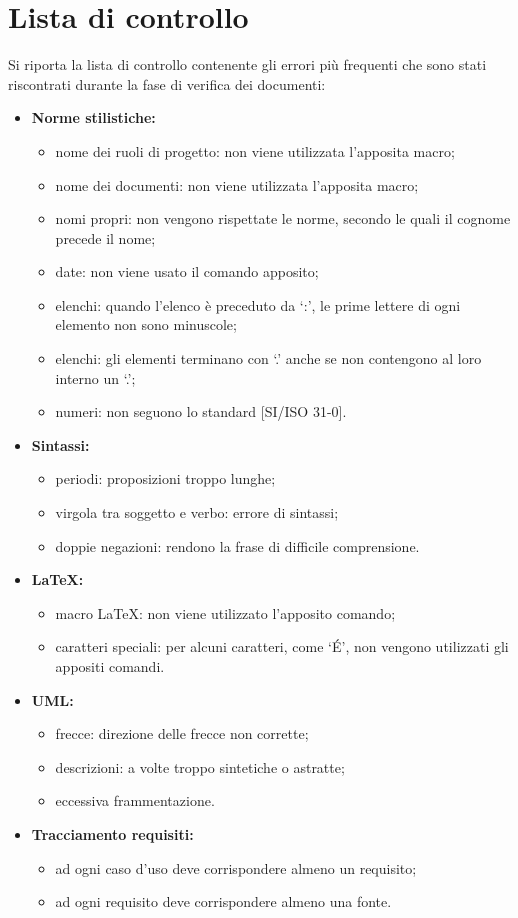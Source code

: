 \section{Lista di controllo}
Si riporta la lista di controllo contenente gli errori più frequenti che sono stati riscontrati durante la fase di verifica dei documenti:
\begin{itemize}
	\item \textbf{Norme stilistiche:}
	\begin{itemize}
		\item nome dei ruoli di progetto: non viene utilizzata l'apposita macro;
		\item nome dei documenti: non viene utilizzata l'apposita macro;
		\item nomi propri: non vengono rispettate le norme, secondo le quali il cognome precede il nome;
		\item date: non viene usato il comando apposito;
		\item elenchi: quando l'elenco è preceduto da ‘:’, le prime lettere di ogni elemento non sono minuscole;
		\item elenchi: gli elementi terminano con ‘.’ anche se non contengono al loro interno un ‘.’;
		\item numeri: non seguono lo standard [SI/ISO 31-0].
	\end{itemize}
	\item \textbf{Sintassi:}
	\begin{itemize}
		\item periodi: proposizioni troppo lunghe;
		\item virgola tra soggetto e verbo: errore di sintassi;
		\item doppie negazioni: rendono la frase di difficile comprensione.
	\end{itemize}
	\item \textbf{\LaTeX{}:}
	\begin{itemize}
		\item macro \LaTeX{}: non viene utilizzato l'apposito comando;
		\item caratteri speciali: per alcuni caratteri, come ‘\'{E}’, non vengono utilizzati gli appositi comandi.
	\end{itemize}
	\item \textbf{UML:}
	\begin{itemize}
		\item frecce: direzione delle frecce non corrette;
		\item descrizioni: a volte troppo sintetiche o astratte;
		\item eccessiva frammentazione.
	\end{itemize}
	\item \textbf{Tracciamento requisiti:}
	\begin{itemize}
		\item ad ogni caso d'uso deve corrispondere almeno un requisito;
		\item ad ogni requisito deve corrispondere almeno una fonte.
	\end{itemize}
\end{itemize}

